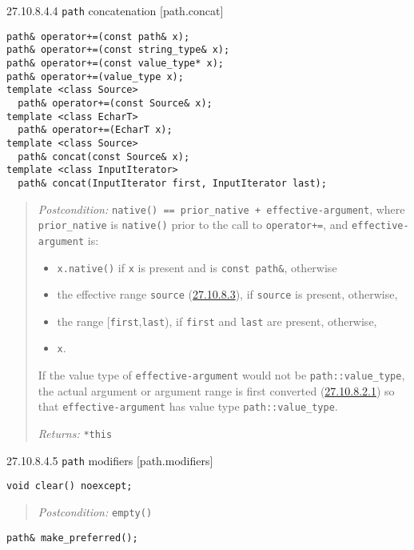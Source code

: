 27.10.8.4.4 \texttt{path} concatenation {[}path.concat{]}

\begin{verbatim}
path& operator+=(const path& x);
path& operator+=(const string_type& x);
path& operator+=(const value_type* x);
path& operator+=(value_type x);
template <class Source>
  path& operator+=(const Source& x);
template <class EcharT>
  path& operator+=(EcharT x);
template <class Source>
  path& concat(const Source& x);
template <class InputIterator>
  path& concat(InputIterator first, InputIterator last);
\end{verbatim}

\begin{quote}
\emph{Postcondition:}
\texttt{native()\ ==\ prior\_native\ +\ effective-argument}, where
\texttt{prior\_native} is \texttt{native()} prior to the call to
\texttt{operator+=}, and \texttt{effective-argument} is:

\begin{itemize}
\tightlist
\item
  \texttt{x.native()} if \texttt{x} is present and is
  \texttt{const\ path\&}, otherwise
\item
  the effective range \texttt{source} (\hyperref[path.req]{27.10.8.3}),
  if \texttt{source} is present, otherwise,
\item
  the range {[}\texttt{first},\texttt{last}), if \texttt{first} and
  \texttt{last} are present, otherwise,
\item
  \texttt{x}.
\end{itemize}

If the value type of \texttt{effective-argument} would not be
\texttt{path::value\_type}, the actual argument or argument range is
first converted (\hyperref[path.arg.convert]{27.10.8.2.1}) so that
\texttt{effective-argument} has value type \texttt{path::value\_type}.

\emph{Returns:} \texttt{*this}
\end{quote}

27.10.8.4.5 \texttt{path} modifiers {[}path.modifiers{]}

\begin{verbatim}
void clear() noexcept;
\end{verbatim}

\begin{quote}
\emph{Postcondition:} \texttt{empty()}
\end{quote}

\begin{verbatim}
path& make_preferred();
\end{verbatim}


